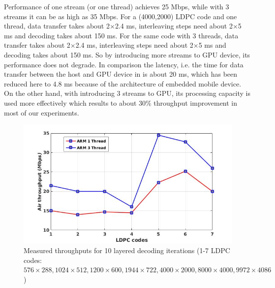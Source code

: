 \documentclass{article}
\begin{document}
Performance of one stream (or one thread) achieves 25 Mbps, while with 3 streams it can be as high as 35 Mbps. For a (4000,2000) LDPC code and one thread, data transfer takes about 2$\times$2.4 ms, interleaving steps need about 2$\times$5 ms and decoding takes about 150 ms. For the same code with 3 threads, data transfer takes about 2$\times$2.4 ms, interleaving steps need about 2$\times$5 ms and decoding takes about 150 ms. So by introducing more streams to GPU device, its performance does not degrade. In comparison the latency, i.e. the time for data transfer between the host and GPU device in \cite{art_gpu_0} is about 20 ms, which has been reduced here to 4.8 ms because of the architecture of embedded mobile device. On the other hand, with introducing 3 streams to GPU, its processing capacity is used more effectively which results to about 30\% throughput improvement in most of our experiments.

\begin{figure}[h]
\begin{centering}
\includegraphics[scale=0.43]{air.jpg}
\caption[width=.5\textwidth]{Measured throughputs for 10 layered decoding iterations (1-7 LDPC codes: $576 \times 288, 1024 \times 512, 1200 \times 600, 1944 \times 722, 4000 \times 2000, 8000 \times 4000, 9972 \times 4086$)}\label{fig::air}
\end{centering}
\end{figure}
\end{document}
